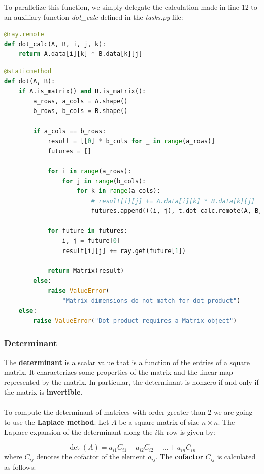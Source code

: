 \vfill
To parallelize this function, we simply delegate the calculation made in line 12 to an auxiliary function \textit{dot\_calc} defined in the \textit{tasks.py} file:
\begin{lstlisting}[language=Python, caption={dot\_calc}]
@ray.remote
def dot_calc(A, B, i, j, k):
    return A.data[i][k] * B.data[k][j]
\end{lstlisting}

\begin{lstlisting}[language=Python, caption={Parallelized dot function}]
@staticmethod
def dot(A, B):
    if A.is_matrix() and B.is_matrix():
        a_rows, a_cols = A.shape()
        b_rows, b_cols = B.shape()

        if a_cols == b_rows:
            result = [[0] * b_cols for _ in range(a_rows)]
            futures = []

            for i in range(a_rows):
                for j in range(b_cols):
                    for k in range(a_cols):
                        # result[i][j] += A.data[i][k] * B.data[k][j]
                        futures.append(((i, j), t.dot_calc.remote(A, B, i, j, k)))
            
            for future in futures:
                i, j = future[0]
                result[i][j] += ray.get(future[1])

            return Matrix(result)
        else:
            raise ValueError(
                "Matrix dimensions do not match for dot product")
    else:
        raise ValueError("Dot product requires a Matrix object")
\end{lstlisting}

\pagebreak
\subsubsection{Determinant}
The \textbf{determinant} is a scalar value that is a function of the entries of a square matrix. It characterizes some properties of the matrix and the linear map represented by the matrix. In particular, the determinant is nonzero if and only if the matrix is \textbf{invertible}.
\\\\
To compute the determinant of matrices with order greater than 2 we are going to use the \textbf{Laplace method}. Let $A$ be a square matrix of size $n \times n$. The Laplace expansion of the determinant along the $i$th row is given by:

$$
    \det(A) = a_{i1} C_{i1} + a_{i2} C_{i2} + \ldots + a_{in} C_{in}
$$
where $C_{ij}$ denotes the cofactor of the element $a_{ij}$. The \textbf{cofactor} $C_{ij}$ is calculated as follows:

